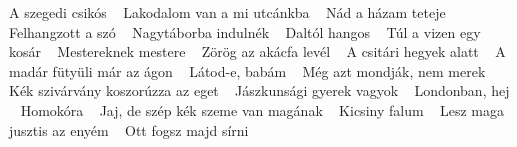 \footnotesize A szegedi csikós \ \textbf{\pageref{dicsikC3B3s}} \newline
\footnotesize Lakodalom van a mi utcánkba \ \textbf{\pageref{omvanamiutcC3A1nkba}} \newline
\footnotesize Nád a házam teteje \ \textbf{\pageref{dahC3A1zamteteje}} \newline
\footnotesize Felhangzott a szó \ \textbf{\pageref{zottaszC3B3}} \newline
\footnotesize Nagytáborba indulnék \ \textbf{\pageref{3A1borbaindulnC3A9k}} \newline
\footnotesize Daltól hangos \ \textbf{\pageref{B3lhangos}} \newline
\footnotesize Túl a vizen egy kosár \ \textbf{\pageref{lavizenegykosC3A1r}} \newline
\footnotesize Mestereknek mestere \ \textbf{\pageref{knekmestere}} \newline
\footnotesize Zörög az akácfa levél \ \textbf{\pageref{rC3B6gazakC3A1cfalevC3A9l}} \newline
\footnotesize A csitári hegyek alatt \ \textbf{\pageref{C3A1rihegyekalatt}} \newline
\footnotesize A madár fütyüli már az ágon \ \textbf{\pageref{3A1rfC3BCtyC3BClimC3A1razC3A1gon}} \newline
\footnotesize Látod-e, babám \ \textbf{\pageref{tod-e2CbabC3A1m}} \newline
\footnotesize Még azt mondják, nem merek \ \textbf{\pageref{gaztmondjC3A1k2Cnemmerek}} \newline
\footnotesize Kék szivárvány koszorúzza az eget \ \textbf{\pageref{kszivC3A1rvC3A1nykoszorC3BAzzaazeget}} \newline
\footnotesize Jászkunsági gyerek vagyok \ \textbf{\pageref{szkunsC3A1gigyerekvagyok}} \newline
\footnotesize Londonban, hej \ \textbf{\pageref{an2Chej}} \newline
\footnotesize Homokóra \ \textbf{\pageref{3B3ra}} \newline
\footnotesize Jaj, de szép kék szeme van magának \ \textbf{\pageref{szC3A9pkC3A9kszemevanmagC3A1nak}} \newline
\footnotesize Kicsiny falum \ \textbf{\pageref{falum}} \newline
\footnotesize Lesz maga jusztis az enyém \ \textbf{\pageref{gajusztisazenyC3A9m}} \newline
\footnotesize Ott fogsz majd sírni \ \textbf{\pageref{szmajdsC3ADrni}} \newline
